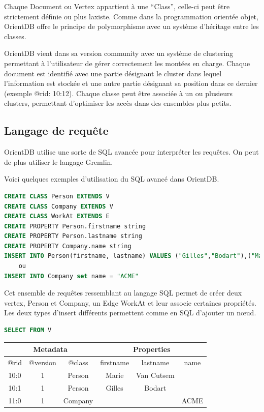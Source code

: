 \documentclass[a4paper,fleqn,12pt]{report}
\begin{document}
Chaque Document ou Vertex appartient à une \enquote{Class}, celle-ci peut être strictement définie ou plus laxiste. Comme dans la programmation orientée objet, OrientDB offre le principe de polymorphisme avec un système d'héritage entre les classes. 

OrientDB vient dans sa version community avec un système de clustering permettant à l’utilisateur de gérer correctement les montées en charge. Chaque document est identifié avec une partie désignant le cluster dans lequel l’information est stockée et une autre partie désignant sa position dans ce dernier (exemple @rid: 10:12). Chaque classe peut être associée à un ou plusieurs clusters, permettant d’optimiser les accès dans des ensembles plus petits.


\subsection{Langage de requête}

OrientDB utilise une sorte de SQL avancée pour interpréter les requêtes. On peut de plus utiliser le langage Gremlin.

Voici quelques exemples d'utilisation du SQL avancé dans OrientDB.

\begin{lstlisting}[language=SQL]
CREATE CLASS Person EXTENDS V
CREATE CLASS Company EXTENDS V
CREATE CLASS WorkAt EXTENDS E
CREATE PROPERTY Person.firstname string
CREATE PROPERTY Person.lastname string
CREATE PROPERTY Company.name string
INSERT INTO Person(firstname, lastname) VALUES ("Gilles","Bodart"),("Marie","Van Cutsem")
	ou
INSERT INTO Company set name = "ACME"

\end{lstlisting}

Cet ensemble de requêtes ressemblant au langage SQL permet de créer deux vertex, Person et Company, un Edge WorkAt et leur associe certaines propriétés. Les deux types d’insert différents permettent comme en SQL d’ajouter un nœud.

\begin{lstlisting}[language=SQL]
SELECT FROM V
\end{lstlisting}
\begin{center}
	\begin{tabular}{|c|c|c|c|c|c|}
   		\hline
  		\multicolumn{3}{|c|}{Metadata} & \multicolumn{3}{c|}{Properties} \\
   		\hline
   		@rid & @version & @class & firstname & lastname & name \\
   		\hline
   		10:0 & 1 & Person & Marie & Van Cutsem &  \\
   		10:1 & 1 & Person & Gilles & Bodart &  \\
   		11:0 & 1 & Company &  &  & ACME \\
   		\hline
	\end{tabular}
\end{center}
\end{document}

